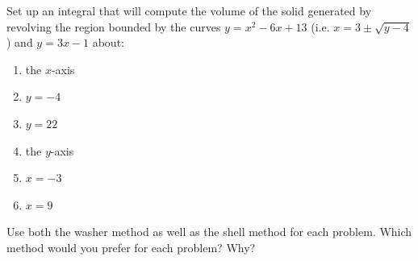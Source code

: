 \documentclass[]{ximera}
\begin{document}
\begin{problem}
Set up an integral that will compute the volume of the solid generated by revolving the region bounded by the curves $y=x^2-6x+13$ (i.e. $x = 3 \pm \sqrt{y-4}$) and $y=3x-1$ about:
	\begin{enumerate}
		\item  the $x$-axis
		\begin{freeResponse}
		
		\end{freeResponse}
		
		\item  $y=-4$  
		\begin{freeResponse}
		
		\end{freeResponse}
		
		\item  $y=22$
		\begin{freeResponse}
		
		\end{freeResponse}
		
		\item  the $y$-axis
		\begin{freeResponse}
		
		\end{freeResponse}
		
		\item  $x=-3$
		\begin{freeResponse}
		
		\end{freeResponse}
		
		\item$x=9$
		\begin{freeResponse}
		
		\end{freeResponse}
		
	\end{enumerate}
	
Use both the washer method as well as the shell method for each problem.  
Which method would you prefer for each problem?  Why?


\end{problem}
\end{document}
